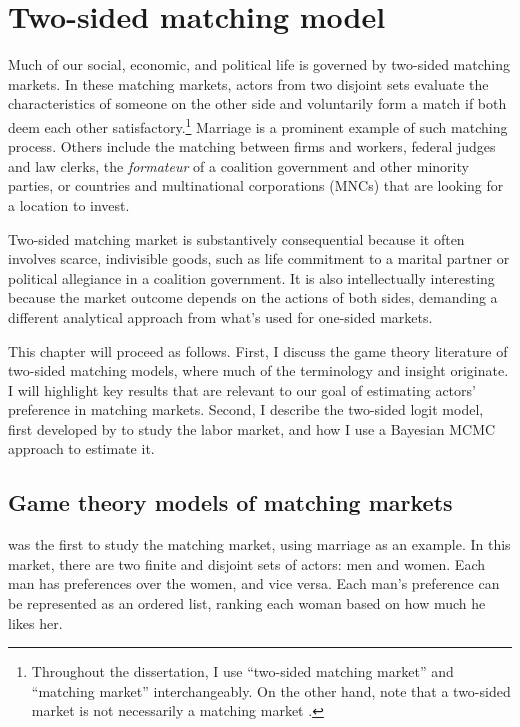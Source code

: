 \chapter{Two-sided matching model}
\label{chap:model}

Much of our social, economic, and political life is governed by two-sided
matching markets. In these matching markets, actors from two disjoint sets
evaluate the characteristics of someone on the other side and voluntarily form a
match if both deem each other satisfactory.\footnote{Throughout the
  dissertation, I use ``two-sided matching market'' and ``matching market''
  interchangeably. On the other hand, note that a two-sided market is not
  necessarily a matching market \citep{Rysman2009}.} Marriage is a prominent
example of such matching process. Others include the matching between firms and
workers, federal judges and law clerks, the \textit{formateur} of a coalition
government and other minority parties, or countries and multinational
corporations (MNCs) that are looking for a location to invest.

Two-sided matching market is substantively consequential because it often
involves scarce, indivisible goods, such as life commitment to a marital partner
or political allegiance in a coalition government. It is also intellectually
interesting because the market outcome depends on the actions of both sides,
demanding a different analytical approach from what's used for one-sided
markets.

This chapter will proceed as follows. First, I discuss the game theory
literature of two-sided matching models, where much of the terminology and
insight originate. I will highlight key results that are relevant to our goal of
estimating actors' preference in matching markets. Second, I describe the
two-sided logit model, first developed by \citet{Logan1996} to study the labor market, and how I use a Bayesian MCMC approach to estimate it.

\section{Game theory models of matching markets}
\label{sec:game_theory}

\citet{Gale1962} was the first to study the matching market, using marriage as
an example. In this market, there are two finite and disjoint sets of actors:
men and women. Each man has preferences over the women, and vice versa. Each
man's preference can be represented as an ordered list, ranking each woman based
on how much he likes her.

